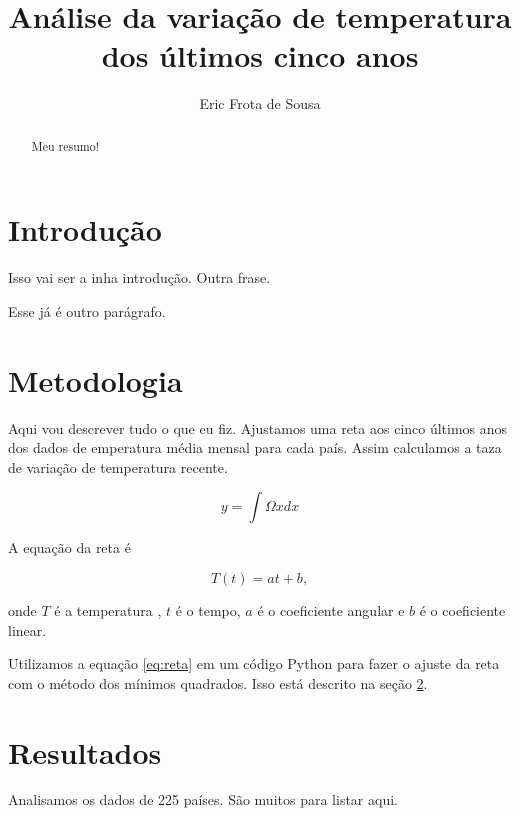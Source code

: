 \documentclass{article}
\begin{document}
\title{Análise da variação de temperatura dos últimos cinco anos}
\author{Eric Frota de Sousa}

\maketitle

\begin{abstract}
Meu resumo!
\end{abstract}

\section{Introdução}
Isso vai ser a inha introdução.
Outra frase.

Esse já é outro parágrafo.

\section{Metodologia}
\label{sec:metodos}

Aqui vou descrever tudo o que eu fiz.
Ajustamos uma reta aos cinco últimos anos dos dados
de emperatura média mensal para cada país.
Assim calculamos a taza de variação de temperatura recente.



\begin{equation}
y = \int\Omega x dx
\end{equation}

A equação da reta é

\begin{equation}
T(t) = a t + b,
\label{eq:reta}
\end{equation}

\noindent
onde $T$ é a temperatura , $t$ é o tempo, $a$ é o coeficiente angular
e $b$ é o coeficiente linear.

Utilizamos a equação \ref{eq:reta} em um código Python para fazer o ajuste da
reta com o método dos mínimos quadrados.
Isso está descrito na seção \ref{sec:metodos}.


\section{Resultados}

Analisamos os dados de 225 países. São muitos para listar aqui.
\end{document}
